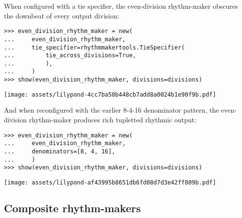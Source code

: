 \noindent When configured with a tie specifier, the even-division rhythm-maker
obscures the downbeat of every output division:

\begin{comment}
<abjad>
even_division_rhythm_maker = new(
    even_division_rhythm_maker,
    tie_specifier=rhythmmakertools.TieSpecifier(
        tie_across_divisions=True,
        ),
    )
show(even_division_rhythm_maker, divisions=divisions)
</abjad>
\end{comment}

\begin{singlespacing}
\vspace{-0.5\baselineskip}
\begin{lstlisting}
>>> even_division_rhythm_maker = new(
...     even_division_rhythm_maker,
...     tie_specifier=rhythmmakertools.TieSpecifier(
...         tie_across_divisions=True,
...         ),
...     )
>>> show(even_division_rhythm_maker, divisions=divisions)
\end{lstlisting}
\noindent\texttt{[image: assets/lilypond-4cc7ba58b448cb7add8a0024b1e90f9b.pdf]}
\end{singlespacing}

\noindent And when reconfigured with the earlier 8-4-16 denominator pattern,
the even-division rhythm-maker produces rich tupletted rhythmic output:

\begin{comment}
<abjad>
even_division_rhythm_maker = new(
    even_division_rhythm_maker,
    denominators=[8, 4, 16],
    )
show(even_division_rhythm_maker, divisions=divisions)
</abjad>
\end{comment}

\begin{singlespacing}
\vspace{-0.5\baselineskip}
\begin{lstlisting}
>>> even_division_rhythm_maker = new(
...     even_division_rhythm_maker,
...     denominators=[8, 4, 16],
...     )
>>> show(even_division_rhythm_maker, divisions=divisions)
\end{lstlisting}
\noindent\texttt{[image: assets/lilypond-af43995b8651db6fd08d7d3e42ff809b.pdf]}
\end{singlespacing}

\subsection{Composite rhythm-makers} %

